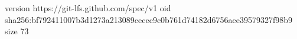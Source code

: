 version https://git-lfs.github.com/spec/v1
oid sha256:bf792411007b3d1273a213089cecec9c0b761d74182d6756aee39579327f98b9
size 73

